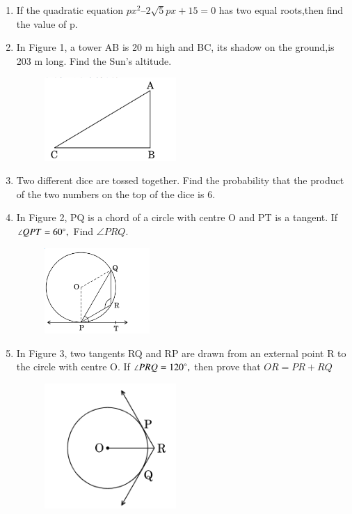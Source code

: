 \documentclass[journal,12pt,twocolumn]{IEEEtran}
\begin{document}
\begin{enumerate}
\item If the quadratic equation $px^2 – 2 \sqrt{5} px + 15 = 0 $ has two equal roots,then find the value of p.
\item In Figure 1, a tower AB is 20 m high and BC, its shadow on the ground,is 203 m long. Find the Sun’s altitude.
\begin{figure}[h!]
    \centering
    \includegraphics[width=5cm]{image1.png}
 \end{figure}
\item Two different dice are tossed together. Find the probability that the product of the two numbers on the top of the dice is 6.
\item In Figure 2, PQ is a chord of a circle with centre O and PT is a tangent. If $\angle QPT = 60 \degree,$ Find $\angle PRQ $.
 \begin{figure}[h!]
    \centering
    \includegraphics[width=4cm]{image2.png}
 \end{figure}
 \item In Figure 3, two tangents RQ and RP are drawn from an external point R to the circle with centre O. If $\angle PRQ = 120 \degree,$ then prove that $OR = PR + RQ $
  \begin{figure}[H]
    \centering
    \includegraphics[width=5cm]{image3.png}
  \end{figure} 

\end{enumerate}
\end{document}
